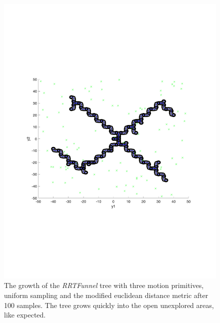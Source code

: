 \begin{figure}
  \includegraphics[scale=.5]{figures/rrtfunnel/rrtfunnel-modified-euclidean-100samples}
  \caption{The growth of the \textit{RRTFunnel} tree with three motion
    primitives, uniform sampling and the modified euclidean distance metric
    after 100 samples. The tree grows quickly into the open unexplored areas,
    like expected.}
\end{figure}

